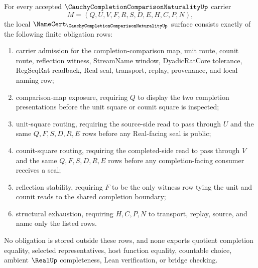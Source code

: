 \begin{theorem}
\label{thm:cauchy-completion-comparison-naturality-namecert-obligations}
For every accepted $\CauchyCompletionComparisonNaturalityUp$ carrier
$$
M=(Q,U,V,F,R,S,D,E,H,C,P,N),
$$
the local $\NameCert_{\CauchyCompletionComparisonNaturalityUp}$ surface consists exactly of the following finite obligation rows:
\begin{enumerate}
\item carrier admission for the completion-comparison map, unit route, counit route, reflection witness, StreamName window, DyadicRatCore tolerance, RegSeqRat readback, Real seal, transport, replay, provenance, and local naming row;
\item comparison-map exposure, requiring $Q$ to display the two completion presentations before the unit square or counit square is inspected;
\item unit-square routing, requiring the source-side read to pass through $U$ and the same $Q,F,S,D,R,E$ rows before any Real-facing seal is public;
\item counit-square routing, requiring the completed-side read to pass through $V$ and the same $Q,F,S,D,R,E$ rows before any completion-facing consumer receives a seal;
\item reflection stability, requiring $F$ to be the only witness row tying the unit and counit reads to the shared completion boundary;
\item structural exhaustion, requiring $H,C,P,N$ to transport, replay, source, and name only the listed rows.
\end{enumerate}
No obligation is stored outside these rows, and none exports quotient completion equality, selected representatives, host function equality, countable choice, ambient $\RealUp$ completeness, Lean verification, or bridge checking.
\end{theorem}
